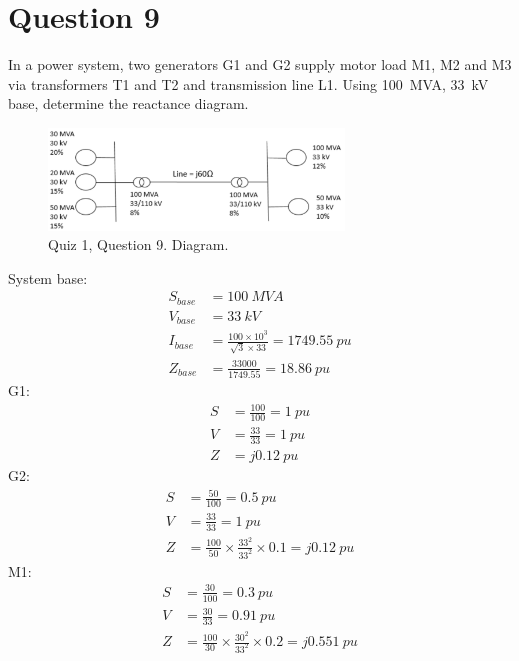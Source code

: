 \section{Question 9}
In a power system, two generators G1 and G2 supply motor load M1, M2 and M3 via transformers T1 and T2 and transmission line L1. Using \SI{100}{MVA}, \SI{33}{kV} base, determine the reactance diagram.
\begin{figure}[H]
    \centering
    \includegraphics[width = 0.7\textwidth]{img/figure149.png}
    \caption{Quiz 1, Question 9. Diagram.}
\end{figure}
System base:
\begin{align}
    S_{base} & = \SI{100}{MVA}                                               \\
    V_{base} & = \SI{33}{kV}                                                 \\
    I_{base} & = \frac{100\times 10^3}{\sqrt{3}\times 33} = \SI{1749.55}{pu} \\
    Z_{base} & = \frac{33000}{1749.55} = \SI{18.86}{pu}
\end{align}
G1:
\begin{align}
    S & = \frac{100}{100} = \SI{1}{pu} \\
    V & = \frac{33}{33} = \SI{1}{pu}   \\
    Z & = j\SI{0.12}{pu}
\end{align}
G2:
\begin{align}
    S & = \frac{50}{100} = \SI{0.5}{pu}                                     \\
    V & = \frac{33}{33} = \SI{1}{pu}                                        \\
    Z & = \frac{100}{50}\times \frac{33^2}{33^2}\times 0.1 = j\SI{0.12}{pu}
\end{align}
M1:
\begin{align}
    S & = \frac{30}{100} = \SI{0.3}{pu}                                      \\
    V & = \frac{30}{33} = \SI{0.91}{pu}                                      \\
    Z & = \frac{100}{30}\times \frac{30^2}{33^2}\times 0.2 = j\SI{0.551}{pu}
\end{align}
